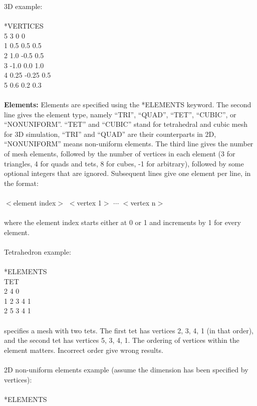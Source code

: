 \documentclass[11pt,fullpage]{article}
\begin{document}
\noindent{}3D example:
\\\\
\noindent{}*VERTICES\\
5 3 0 0\\
1 0.5 0.5 0.5\\
2 1.0 -0.5 0.5\\
3 -1.0 0.0 1.0\\
4 0.25 -0.25 0.5\\
5 0.6 0.2 0.3
\\\\
\noindent{}\textbf{Elements:} Elements are specified using the
*ELEMENTS keyword. The second line gives the element type, namely
``TRI'', ``QUAD'', ``TET'', ``CUBIC'', or ``NONUNIFORM''. ``TET'' and ``CUBIC'' stand
for tetrahedral and cubic mesh for 3D simulation, ``TRI'' and ``QUAD''
are their counterparts in 2D, ``NONUNIFORM'' means non-uniform elements. The third line gives the
number of mesh elements, followed by the number of vertices in each
element (3 for triangles, 4 for quads and tets, 8 for cubes, -1 for arbitrary), followed
by some optional integers that are ignored. Subsequent lines give one
element per line, in the format:
\\\\
\noindent{}$<$element index$>$ $<$vertex 1$>$ $\cdots$ $<$vertex n$>$
\\\\
\noindent{}where the element index starts either at 0 or 1 and
increments by 1 for every element. 
\\\\
\noindent{}Tetrahedron example:
\\\\
\noindent{}*ELEMENTS\\
TET\\
2 4 0\\
1 2 3 4 1\\
2 5 3 4 1
\\\\
\noindent{} specifies a mesh with two tets. The first tet has vertices
2, 3, 4, 1 (in that order), and the second tet has vertices 5, 3, 4,
1. The ordering of vertices within the element matters. Incorrect
order give wrong results.
\\\\
\noindent{}2D non-uniform elements example (assume the dimension has
been specified by vertices):
\\\\
\noindent{}*ELEMENTS\\
\end{document}
